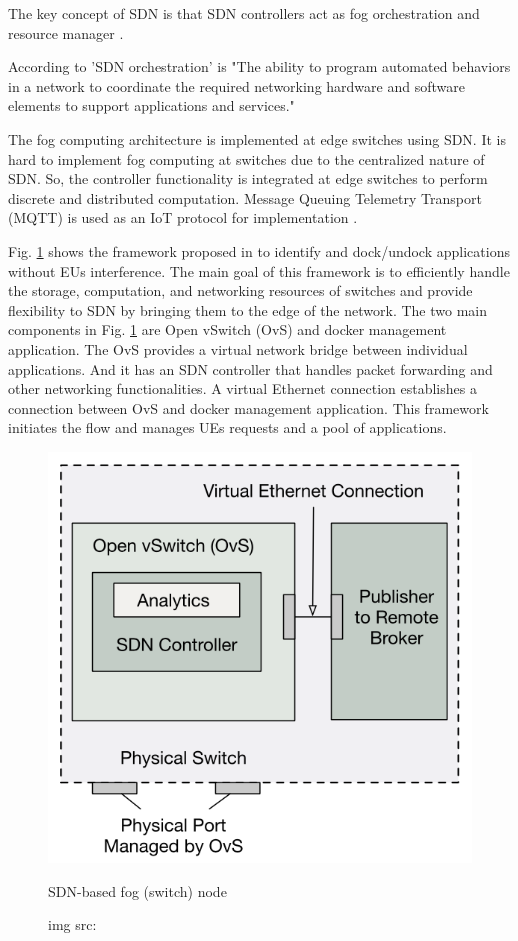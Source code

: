 The key concept of SDN is that SDN controllers act as fog orchestration and resource manager \cite{mukherjee2018survey}. \par

According to \cite{sdx} 'SDN orchestration' is "The ability to program automated behaviors in a network to coordinate the required networking hardware and software elements to support applications and services." \par

The fog computing architecture is implemented at edge switches using SDN. It is hard to implement fog computing at switches due to the centralized nature of SDN. So, the controller functionality is integrated at edge switches to perform discrete and distributed computation. Message Queuing Telemetry Transport (MQTT) is used as an IoT protocol for implementation \cite{mukherjee2018survey}.  

Fig. \ref{fig:sdn-based fog (switch) node} shows the framework proposed in \cite{xu2016sdn} to identify and dock/undock applications without EUs interference. The main goal of this framework is to efficiently handle the storage, computation, and networking resources of switches and provide flexibility to SDN by bringing them to the edge of the network. 
The two main components in Fig. \ref{fig:sdn-based fog (switch) node} are Open vSwitch (OvS) and docker management application. The OvS provides a virtual network bridge between individual applications. And it has an SDN controller that handles packet forwarding and other networking functionalities. A virtual Ethernet connection establishes a connection between OvS and docker management application. This framework initiates the flow and manages UEs requests and a pool of applications.

\begin{figure}[H]
    \centering
    \includegraphics[width=.5\linewidth]{image/SDN-based fog (switch) node.png}
    \caption{SDN-based fog (switch) node}
    \caption*{img src: \cite{mukherjee2018survey}}
    \label{fig:sdn-based fog (switch) node}
\end{figure}

